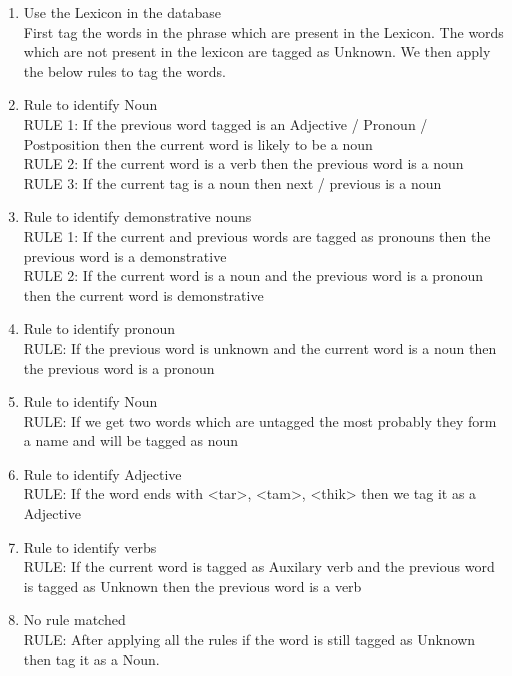 \break
\begin{enumerate}
\item Use the Lexicon in the database \\
First tag the words in the phrase which are present in the Lexicon. The words which are not present in the lexicon are tagged as Unknown. We then apply the below rules to tag the words.

\item{Rule to identify Noun} \\
RULE 1: If the previous word tagged is an Adjective / Pronoun / Postposition then the current word is likely to be a noun \\	
RULE 2: If the current word is a verb then the previous word is a noun \\
RULE 3: If the current tag is a noun then next / previous is a noun
		
\item{Rule to identify demonstrative nouns} \\
RULE 1: If the current and previous words are tagged as pronouns then the previous word is a demonstrative \\
RULE 2: If the current word is a noun and the previous word is a pronoun then the current word is demonstrative
		
\item{Rule to identify pronoun} \\
RULE: If the previous word is unknown and the current word is a noun then the previous word is a pronoun
		
\item{Rule to identify Noun} \\		
RULE: If we get two words which are untagged the most probably they form a name and will be tagged as noun
		
\item{Rule to identify Adjective} \\
RULE: If the word ends with <tar>, <tam>, <thik> then we tag it as a Adjective
		
\item{Rule to identify verbs} \\
RULE: If the current word is tagged as Auxilary verb  and the previous word is tagged as Unknown then  the previous word is a verb

\item{No rule matched} \\
RULE: After applying all the rules if the word is still tagged as Unknown then tag it as a Noun.
		
\end{enumerate}
	

